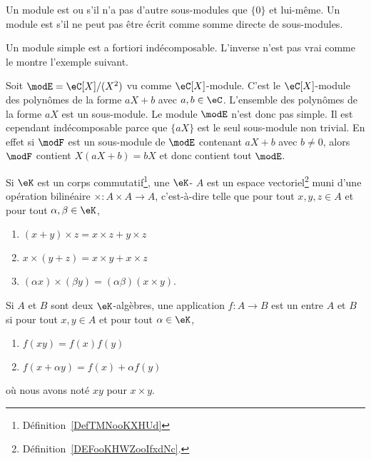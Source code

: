 \begin{definition}
    Un module est  ou  s'il n'a pas d'autre sous-modules que \( \{ 0 \}\) et lui-même. Un module est  s'il ne peut pas être écrit comme somme directe de sous-modules.
\end{definition}

Un module simple est a fortiori indécomposable. L'inverse n'est pas vrai comme le montre l'exemple suivant.

\begin{example}
    Soit \( \modE=\eC[X]/(X^2)\) vu comme \( \eC[X]\)-module. C'est le \( \eC[X]\)-module des polynômes de la forme \( aX+b\) avec \( a,b\in \eC\). L'ensemble des polynômes de la forme \( aX\) est un sous-module. Le module \( \modE\) n'est donc pas simple. Il est cependant indécomposable parce que \( \{ aX \}\) est le seul sous-module non trivial. En effet si \( \modF\) est un sous-module de \( \modE\) contenant \( aX+b\) avec \( b\neq 0\), alors \( \modF\) contient \( X(aX+b)=bX\) et donc contient tout \( \modE\).
\end{example}

\begin{definition}   \label{DefAEbnJqI}
    Si \( \eK\) est un corps commutatif\footnote{Définition~\ref{DefTMNooKXHUd}}, une \( \eK\)- \( A\) est un espace vectoriel\footnote{Définition~\ref{DEFooKHWZooIfxdNc}.} muni d'une opération bilinéaire \( \times\colon A\times A\to A\), c'est-à-dire telle que pour tout \( x,y,z\in A\) et pour tout \( \alpha,\beta\in\eK\),
    \begin{enumerate}
        \item
            \( (x+y)\times z=x\times z+y\times z\)
        \item
            \( x\times (y+z)=x\times y+x\times z\)
        \item
            \( (\alpha x)\times (\beta y)=(\alpha\beta)(x\times y)\).
    \end{enumerate}
    Si \( A\) et \( B\) sont deux \( \eK\)-algèbres, une application \( f\colon A\to B\) est un  entre \( A\) et \( B\) si pour tout \( x,y\in A\) et pour tout \( \alpha\in \eK\),
    \begin{enumerate}
        \item
            \( f(xy)=f(x)f(y)\)
        \item
            \( f(x+\alpha y)=f(x)+\alpha f(y)\)
    \end{enumerate}
    où nous avons noté \( xy\) pour \( x\times y\).
\end{definition}


